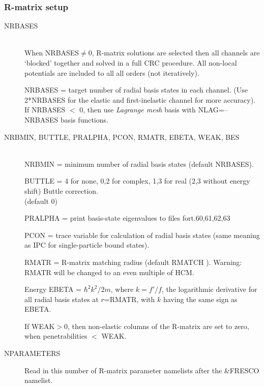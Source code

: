 \documentclass[11pt]{article}
\begin{document}
\subsubsection{R-matrix setup}
\begin{description}

\item[NRBASES] ~\\
When NRBASES$\neq$0, R-matrix solutions are selected then all channels
are `blocked' together and solved in a full CRC procedure. All non-local potentials are included to all all orders (not iteratively).

NRBASES = target number of radial basis states in each channel.
(Use 2*NRBASES for the elastic and first-inelastic channel for more accuracy).\\
If NRBASES $<$ 0, then use {\em Lagrange mesh} basis with NLAG=--NRBASES basis functions.


\item[NRBMIN, BUTTLE, PRALPHA, PCON, RMATR, EBETA, WEAK, BES] ~\\
NRBMIN = minimum number of radial basis states (default NRBASES).

BUTTLE = 4 for none, 0,2 for complex, 1,3 for real
(2,3 without energy shift) Buttle correction.\\
(default 0)

PRALPHA = print basis-state eigenvalues to files fort.60,61,62,63

PCON = trace variable for calculation of radial basis states (same
meaning as IPC for single-particle bound states).


RMATR = R-matrix matching radius (default RMATCH ).
Warning: RMATR will be changed to an even multiple of HCM.


Energy EBETA = $\hbar^2k^2/2m$, where $k= f'/f$, the logarithmic derivative
for all radial basis states at $r$=RMATR, with $k$ having the same
sign as EBETA. 

If WEAK$>$0, then non-elastic columns of the R-matrix are set to zero,
  when penetrabilities $<$ WEAK.
  
 

\item[NPARAMETERS] Read in this number of R-matrix parameter namelists after the \&FRESCO namelist.

\end{description}
\end{document}

